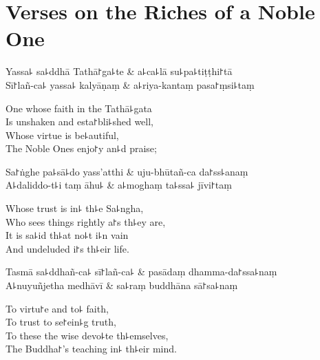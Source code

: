 \clearpage

\chapter{Verses on the Riches of a Noble One}%


\begin{leader}
\end{leader}

\begin{twochants}
  Yassa꜕ sa꜕ddhā Tathā꜓ga꜕te & a꜕ca꜕lā su꜕pa꜕tiṭṭhi꜓tā \\
  Sī꜓lañ-ca꜕ yassa꜕ kalyāṇaṃ & a꜕riya-kantaṃ pasa꜓ṃsi꜕taṃ \\
\end{twochants}

\begin{english}
  One whose faith in the Tathā꜕gata\\
  Is unshaken and esta꜓bli꜕shed well,\\
  Whose virtue is be꜕autiful,\\
  The Noble Ones enjo꜓y an꜕d praise;
\end{english}

\begin{twochants}
  Sa꜓ṅghe pa꜕sā꜕do yass'atthi & uju-bhūtañ-ca da꜓ss꜕anaṃ \\
  A꜕daliddo-t꜕i taṃ āhu꜕ & a꜕moghaṃ ta꜕ssa꜕ jīvi꜓taṃ \\
\end{twochants}

\begin{english}
  Whose trust is in꜕ th꜕e Sa꜕ngha,\\
  Who sees things rightly a꜓s th꜕ey are,\\
  It is sa꜕id th꜕at no꜕t i꜕n vain\\
  And undeluded i꜓s th꜕eir life.
\end{english}

\begin{twochants}
  Tasmā sa꜕ddhañ-ca꜕ sī꜓lañ-ca꜕ & pasādaṃ dhamma-da꜓ssa꜕naṃ \\
  A꜕nuyuñjetha medhāvī & sa꜕raṃ buddhāna sā꜓sa꜕naṃ \\
\end{twochants}

\begin{english}
  To virtu꜓e and to꜕ faith,\\
  To trust to se꜓ein꜕g truth,\\
  To these the wise devo꜕te th꜕emselves,\\
  The Buddha꜓'s teaching in꜕ th꜕eir mind.
\end{english}

